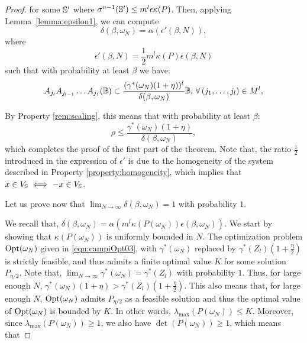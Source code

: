 \begin{proof}
for some $\mathbb{S}'$ where $\sigma^{n-1}(\mathbb{S}') \leq m^l \epsilon \kappa(P)$. Then, applying Lemma~\ref{lemma:epsilon1}, we can compute
$$\delta(\beta, \omega_N) =\alpha(\epsilon'(\beta,N)),$$
where
\begin{equation}\label{eqn:eps2}
\epsilon'(\beta, N) = \frac{1}{2} m^l \kappa(P) \epsilon(\beta,N)
\end{equation} 
such that with probability at least $\beta$ we have:
\begin{equation*}
A_{j_l} A_{j_{l-1}} \dots A_{j_1} (\mathbb{B}) \subset \frac{(\gamma^{*}(\omega_N)(1+\eta))^l}{\delta(\beta, \omega_N)}\mathbb{B},\, \forall\, (j_1,\dots,j_l) \in M^l,
\end{equation*}

By Property \ref{rem:scaling}, this means that with probability at least $\beta$:
$$\rho \leq \frac{\gamma^{*}(\omega_N) (1 + \eta)}{\delta(\beta, \omega_N)},$$
which completes the proof of the first part of the theorem. Note that, the ratio $\frac{1}{2}$ introduced in the expression of $\epsilon'$ is due to the homogeneity of the system described in Property \ref{property:homogeneity}, which implies that $x \in V_{\mathbb{S}} \iff -x \in V_{\mathbb{S}}$. 


%

Let us prove now that $\lim_{N \to \infty} \delta(\beta, \omega_N) = 1$ with probability $1$.

We recall that, $\delta(\beta, \omega_N) = \alpha(m^l \kappa(P(\omega_N)) \epsilon(\beta, \omega_N))$. We start by showing that $\kappa(P(\omega_N))$  is uniformly bounded in $N$. The optimization problem $\text{Opt}(\omega_N)$ given in \eqref{eqn:campiOpt03}, with $\gamma^{*}(\omega_N)$ replaced by $\gamma^{*}(Z_l)(1+\frac{\eta}{2})$ is strictly feasible, and thus admits a finite optimal value $K$ for some solution $P_{\eta/2}$. Note that, $\lim_{N \to \infty} \gamma^{*}(\omega_N)= \gamma^{*}(Z_l)$ with probability $1$. Thus, for large enough $N$, \mbox{$\gamma^{*}(\omega_N)(1+\eta) > \gamma^{*}(Z_l)(1+\frac{\eta}{2})$.} This also means that, for large enough $N$, $\text{Opt}(\omega_N)$ admits $P_{\eta/2}$ as a feasible solution and thus the optimal value of $\text{Opt}(\omega_N)$ is bounded by $K.$ In other words, \mbox{$\lambda_{\max}(P({\omega_N})) \leq K$.} Moreover, since  
$\lambda_{\max}(P(\omega_N))\geq 1$, we also have \mbox{$\det(P(\omega_N)) \geq 1$,} which means that


\end{proof}
